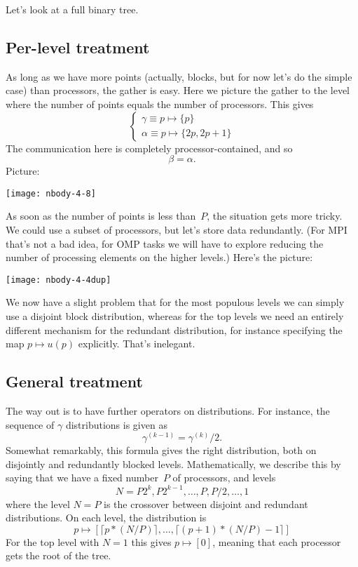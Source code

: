 

Let's look at a full binary tree.

\subsection{Per-level treatment}

As long as we have more points (actually, blocks, but for now let's
do the simple case) than processors, the gather is easy.
Here we picture the gather to the level where the number of points
equals the number of processors. This gives
\[ 
\begin{cases}
  \gamma\equiv p\mapsto\{p\}\\
  \alpha\equiv p\mapsto\{2p,2p+1\}
\end{cases}
\]
The communication here is completely processor-contained,
and so \[ \beta=\alpha. \]
Picture:\par\nobreak
%
\texttt{[image: nbody-4-8]}

As soon as the number of points is less than~$P$, the situation
gets more tricky. We could use a subset of processors, but let's 
store data redundantly. (For MPI that's not a bad idea, for OMP tasks
we will have to explore reducing the number of processing elements
on the higher levels.)
Here's the picture:

\texttt{[image: nbody-4-4dup]}

We now have a slight problem that for the most populous levels
we can simply use a disjoint block distribution, whereas for the top levels
we need an entirely different mechanism for the redundant distribution,
for instance specifying the map $p\mapsto u(p)$ explicitly. That's inelegant.

\subsection{General treatment}

The way out is to have further operators on distributions. For instance, the
sequence of $\gamma$ distributions is given as 
\[ \gamma^{(k-1)}=\gamma^{(k)}/2. \]
Somewhat remarkably, this formula gives the right distribution, both
on disjointly and redundantly blocked levels. 
Mathematically, we describe this by saying that we have a fixed
number~$P$ of processors, and levels 
\[ N=P2^k,P2^{k-1},\ldots,P,P/2,\ldots,1 \]
where the level $N=P$ is the crossover between disjoint and redundant distributions.
On each level, the distribution is
\[ p\mapsto
   \left[ \lceil p*(N/P)\rceil,\ldots,\lceil (p+1)*(N/P)-1 \rceil \right]
\]
For the top level with $N=1$ this gives $p\mapsto[0]$, meaning that
each processor gets the root of the tree.

